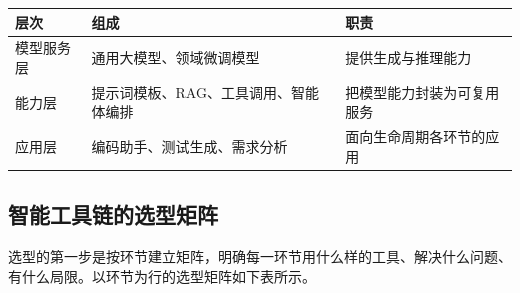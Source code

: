 \documentclass[12pt,a4paper,twoside,openany]{ctexbook}
\numberwithin{figure}{chapter}
\numberwithin{table}{chapter}
\newcounter{none}
\begin{document}
{\def\LTcaptype{none} %
\begin{longtable}[]{@{}
  >{\raggedright\arraybackslash}p{}
  >{\raggedright\arraybackslash}p{}
  >{\raggedright\arraybackslash}p{}@{}}
\toprule\noalign{}
\begin{minipage}[b]{\linewidth}\raggedright
层次
\end{minipage} & \begin{minipage}[b]{\linewidth}\raggedright
组成
\end{minipage} & \begin{minipage}[b]{\linewidth}\raggedright
职责
\end{minipage} \\
\midrule\noalign{}
\endhead
\bottomrule\noalign{}
\endlastfoot
模型服务层 & 通用大模型、领域微调模型 & 提供生成与推理能力 \\
能力层 & 提示词模板、RAG、工具调用、智能体编排 &
把模型能力封装为可复用服务 \\
应用层 & 编码助手、测试生成、需求分析 & 面向生命周期各环节的应用 \\
\end{longtable}
}

\subsection{智能工具链的选型矩阵}\label{ux667aux80fdux5de5ux5177ux94feux7684ux9009ux578bux77e9ux9635}

选型的第一步是按环节建立矩阵，明确每一环节用什么样的工具、解决什么问题、有什么局限。以环节为行的选型矩阵如下表所示。
\end{document}
